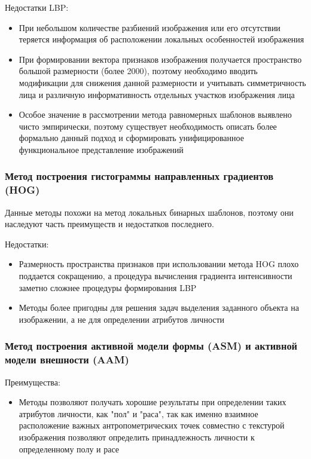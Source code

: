 \documentclass[12pt,a4paper]{article}
\begin{document}
Недостатки LBP:
\begin{itemize}
    \item При небольшом количестве разбиений изображения или его отсутствии теряется информация об расположении локальных особенностей изображения
    \item При формировании вектора признаков изображения получается пространство большой размерности (более 2000), поэтому необходимо вводить модификации для снижения данной размерности и учитывать симметричность лица и различную информативность отдельных участков изображения лица
    \item Особое значение в рассмотрении метода равномерных шаблонов выявлено чисто эмпирически, поэтому существует необходимость описать более формально данный подход и сформировать унифицированное функциональное представление изображений
\end{itemize}

\subsubsection{Метод построения гистограммы направленных градиентов (HOG)}
Данные методы похожи на метод локальных бинарных шаблонов, поэтому они наследуют часть преимуществ и недостатков последнего.

Недостатки:
\begin{itemize}
    \item Размерность пространства признаков при использовании метода HOG плохо поддается сокращению, а процедура вычисления градиента интенсивности заметно сложнее процедуры формирования LBP
    \item Методы более пригодны для решения задач выделения заданного объекта на изображении, а не для определении атрибутов личности
\end{itemize}

\subsubsection{Метод построения активной модели формы (ASM) и активной модели внешности (AAM)}
Преимущества:
\begin{itemize}
    \item Методы позволяют получать хорошие результаты при определении таких атрибутов личности, как "пол" и "раса", так как именно взаимное расположение важных антропометрических точек совместно с текстурой изображения позволяют определить принадлежность личности к определенному полу и расе
\end{itemize}
\end{document}
